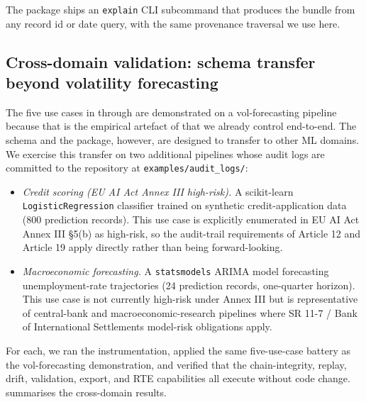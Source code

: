 The package ships an \texttt{explain} CLI subcommand that produces the bundle from any record id or date query, with the same provenance traversal we use here.

\subsection{Cross-domain validation: schema transfer beyond volatility forecasting}\label{sec:demonstration_crossdomain}

The five use cases in  through  are demonstrated on a vol-forecasting pipeline because that is the empirical artefact of \citet{KhanVol2026} that we already control end-to-end. The schema and the package, however, are designed to transfer to other ML domains. We exercise this transfer on two additional pipelines whose audit logs are committed to the repository at \texttt{examples/audit\_logs/}:

\begin{itemize}[leftmargin=*]
    \item \textit{Credit scoring (EU AI Act Annex III high-risk).} A scikit-learn \texttt{LogisticRegression} classifier trained on synthetic credit-application data (800 prediction records). This use case is explicitly enumerated in EU AI Act Annex III §5(b) as high-risk, so the audit-trail requirements of Article 12 and Article 19 apply directly rather than being forward-looking.
    \item \textit{Macroeconomic forecasting.} A \texttt{statsmodels} ARIMA model forecasting unemployment-rate trajectories (24 prediction records, one-quarter horizon). This use case is not currently high-risk under Annex III but is representative of central-bank and macroeconomic-research pipelines where SR 11-7 / Bank of International Settlements model-risk obligations apply.
\end{itemize}

For each, we ran the instrumentation, applied the same five-use-case battery as the vol-forecasting demonstration, and verified that the chain-integrity, replay, drift, validation, export, and RTE capabilities all execute without code change.  summarises the cross-domain results.

